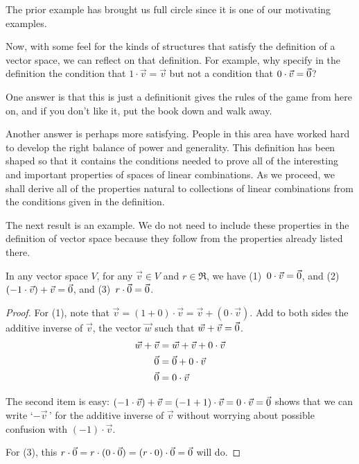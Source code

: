 The prior example has brought us full circle since it is one of
our motivating examples.

\begin{remark}
Now, with some feel for the kinds of structures that satisfy the definition
of a vector space, we can reflect on that definition.
For example, why specify in the definition the condition that 
\( 1\cdot\vec{v}=\vec{v} \) but not a condition that \( 0\cdot\vec{v}=\vec{0} \)?

One answer is that this is just a definition\Dash it gives the rules of the
game from here on, and if you don't like it, put the book down and
walk away.

Another answer is perhaps more satisfying.
People in this area have worked hard to develop the
right balance of power and generality.
This definition has been shaped so that it contains the conditions
needed to prove all of the interesting and
important properties of spaces of linear combinations.
As we proceed, we shall derive all of the properties natural to collections of
linear combinations from the conditions given in the definition.

The next result is an example.
We do not need to include these properties in the definition of vector space
because they follow from the properties already listed there.
\end{remark}

\begin{lemma}
In any vector space \( V \), 
for any \( \vec{v}\in V \) and \( r\in\Re \), we have
(1)~\( 0\cdot\vec{v}=\vec{0} \), and
(2)~\( (-1\cdot\vec{v})+\vec{v}=\vec{0} \), and 
(3)~\( r\cdot\vec{0}=\vec{0} \).
\end{lemma}

\begin{proof}
For (1), note that 
\( \vec{v}=(1+0)\cdot\vec{v}=\vec{v}+(0\cdot\vec{v}) \).
Add to both sides the additive inverse of \( \vec{v} \),
the vector \( \vec{w} \) such that \( \vec{w}+\vec{v}=\vec{0} \).
\begin{align*}
  \vec{w}+\vec{v}
  &=\vec{w}+\vec{v}+0\cdot\vec{v}  \\
  \vec{0}
  &=\vec{0}+0\cdot\vec{v}                   \\
  \vec{0}
  &=0\cdot\vec{v}
\end{align*}

The second item is easy:
\(  (-1\cdot\vec{v})+\vec{v}=(-1+1)\cdot\vec{v}=0\cdot\vec{v}=\vec{0} \)
shows that we can write `\( -\vec{v}\, \)' for the additive inverse
of \( \vec{v} \) without worrying about possible confusion with
\( (-1)\cdot\vec{v} \).

For (3), this
\( r\cdot\vec{0}
  =
  r\cdot(0\cdot\vec{0})
  =
  (r\cdot 0)\cdot\vec{0}
  =
  \vec{0} \)
will do.
\end{proof}

